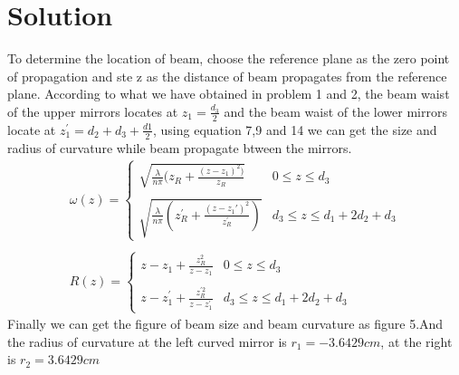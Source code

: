\documentclass{article}
\begin{document}
\section*{Solution}
To determine the location of beam, choose the reference plane as the zero point of propagation and ste z as the distance of beam propagates from the reference plane. According to what we have obtained in problem 1 and 2, the beam waist of the upper mirrors locates at $z_1=\frac{d_3}{2}$ and the beam waist of the lower mirrors locate at $z_{1}^{'}=d_2+d_3+\frac{d1}{2}$, using equation 7,9 and 14 we can get the size and radius of curvature while beam propagate btween the mirrors.
\begin{equation}\label{eq12}
	\begin{array}{l}
	\omega(z)=
	\begin{cases}
	\sqrt{\frac{\lambda}{n\pi}(z_R+\frac{(z-z_1)^2)}{z_R}}& 0\leq z \leq d_3\\
	\\
	\sqrt{\frac{\lambda}{n\pi}(z_{R}^{'}+\frac{(z-z_{1}{'})^2}{z_{R}^{'}})} &d_3\leq z \leq d_1+2d_2+d_3
	\end{cases}
	\\
	\\
	R(z)=
	\begin{cases}
	z-z_1+\frac{z_{R}^{2}}{z-z_1}&0\leq z \leq d_3\\
	\\
	z-z_{1}^{'}+\frac{z_{R}^{'2}}{z-z_{1}^{'}} &d_3\leq z \leq d_1+2d_2+d_3
	\end{cases}
	\end{array}
\end{equation}
Finally we can get the figure of beam size and beam curvature as figure 5.And the radius of curvature at the left curved mirror is $r_1=-3.6429cm $, at the right is $r_2=3.6429cm$
\end{document}
